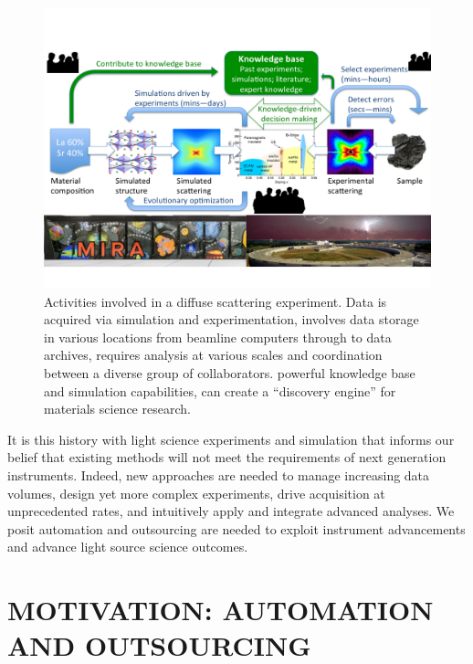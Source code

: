 \documentclass{aip-cp}
\begin{document}
\begin{figure}[h]
  \centerline{\includegraphics[width=6in,trim=0 2.6in 0 1.5in,clip]{Figs/diffuse.png}}
  \caption{Activities involved in a diffuse scattering experiment. Data is acquired
   via simulation and experimentation, involves data storage in various locations
from beamline computers through to data archives, requires analysis at various scales
and coordination between a diverse group of collaborators. 
powerful knowledge base and simulation capabilities, can create a ``discovery engine'' for materials 
science research. 
\label{fig:diffuse}}
\end{figure}

It is this history with light science experiments and simulation that informs our belief that existing methods 
will not meet the requirements of next generation instruments. Indeed, new approaches 
are needed to manage increasing data volumes, design yet more complex
experiments, drive acquisition at unprecedented rates, and intuitively apply
and integrate advanced analyses. We posit automation and outsourcing are needed to exploit 
instrument advancements and advance light source science outcomes.



\section{MOTIVATION: AUTOMATION AND OUTSOURCING}
\end{document}
